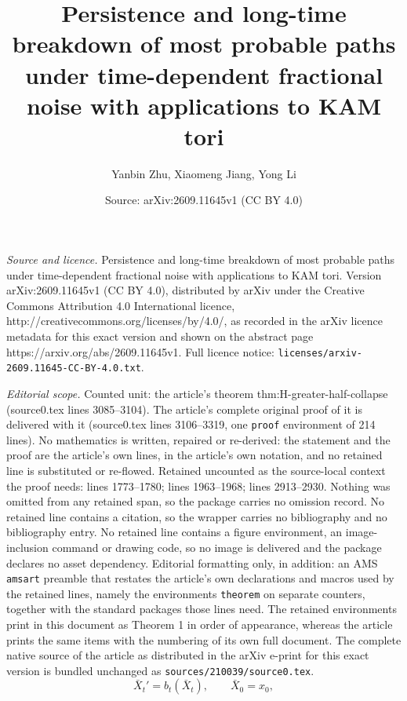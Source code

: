 \documentclass[10pt,a4paper]{amsart}
\title{Persistence and long-time breakdown of most probable paths under time-dependent fractional noise with applications to KAM tori}
\author{Yanbin Zhu, Xiaomeng Jiang, Yong Li}
\date{Source: arXiv:2609.11645v1 (CC BY 4.0)}
\begin{document}
\maketitle

\noindent\emph{Source and licence.} Persistence and long-time breakdown of most probable paths under time-dependent fractional noise with applications to KAM tori. Version arXiv:2609.11645v1 (CC BY 4.0), distributed by arXiv under the Creative Commons Attribution 4.0 International licence, http://creativecommons.org/licenses/by/4.0/, as recorded in the arXiv licence metadata for this exact version and shown on the abstract page https://arxiv.org/abs/2609.11645v1. Full licence notice: \texttt{licenses/arxiv-2609.11645-CC-BY-4.0.txt}.\par\smallskip

\noindent\textit{Editorial scope.} Counted unit: the article's theorem thm:H-greater-half-collapse (source0.tex lines 3085--3104). The article's complete original proof of it is delivered with it (source0.tex lines 3106--3319, one \texttt{proof} environment of 214 lines). No mathematics is written, repaired or re-derived: the statement and the proof are the article's own lines, in the article's own notation, and no retained line is substituted or re-flowed.  Retained uncounted as the source-local context the proof needs: lines 1773--1780; lines 1963--1968; lines 2913--2930.  Nothing was omitted from any retained span, so the package carries no omission record.  No retained line contains a citation, so the wrapper carries no bibliography and no bibliography entry.  No retained line contains a figure environment, an image-inclusion command or drawing code, so no image is delivered and the package declares no asset dependency.  Editorial formatting only, in addition: an AMS \texttt{amsart} preamble that restates the article's own declarations and macros used by the retained lines, namely the environments \texttt{theorem} on separate counters, together with the standard packages those lines need.  The retained environments print in this document as Theorem 1 in order of appearance, whereas the article prints the same items with the numbering of its own full document.  The complete native source of the article as distributed in the arXiv e-print for this exact version is bundled unchanged as \texttt{sources/210039/source0.tex}.
\begin{equation}
\label{nnoise}
    \bar X_t'
    =
    b_t(\bar X_t),
    \qquad
    \bar X_0=x_0,
\end{equation}
\end{document}
